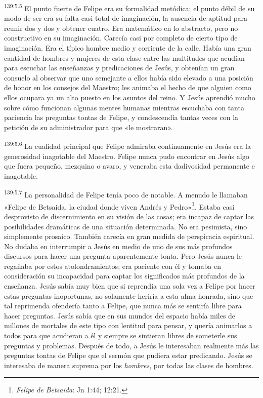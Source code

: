 \par
\textsuperscript{139:5.5} El punto fuerte de Felipe era su formalidad metódica; el punto débil de su modo de ser era su falta casi total de imaginación, la ausencia de aptitud para reunir dos y dos y obtener cuatro. Era matemático en lo abstracto, pero no constructivo en su imaginación. Carecía casi por completo de cierto tipo de imaginación. Era el típico hombre medio y corriente de la calle. Había una gran cantidad de hombres y mujeres de esta clase entre las multitudes que acudían para escuchar las enseñanzas y predicaciones de Jesús, y obtenían un gran consuelo al observar que uno semejante a ellos había sido elevado a una posición de honor en los consejos del Maestro; les animaba el hecho de que alguien como ellos ocupara ya un alto puesto en los asuntos del reino. Y Jesús aprendió mucho sobre cómo funcionan algunas mentes humanas mientras escuchaba con tanta paciencia las preguntas tontas de Felipe, y condescendía tantas veces con la petición de su administrador para que «le mostraran».

\par
\textsuperscript{139:5.6} La cualidad principal que Felipe admiraba continuamente en Jesús era la generosidad inagotable del Maestro. Felipe nunca pudo encontrar en Jesús algo que fuera pequeño, mezquino o avaro, y veneraba esta dadivosidad permanente e inagotable.

\par
\textsuperscript{139:5.7} La personalidad de Felipe tenía poco de notable. A menudo le llamaban «Felipe de Betsaida, la ciudad donde viven Andrés y Pedro»\footnote{\textit{Felipe de Betsaida}: Jn 1:44; 12:21.}. Estaba casi desprovisto de discernimiento en su visión de las cosas; era incapaz de captar las posibilidades dramáticas de una situación determinada. No era pesimista, sino simplemente prosaico. También carecía en gran medida de perspicacia espiritual. No dudaba en interrumpir a Jesús en medio de uno de sus más profundos discursos para hacer una pregunta aparentemente tonta. Pero Jesús nunca le regañaba por estos atolondramientos; era paciente con él y tomaba en consideración su incapacidad para captar los significados más profundos de la enseñanza. Jesús sabía muy bien que si reprendía una sola vez a Felipe por hacer estas preguntas inoportunas, no solamente heriría a esta alma honrada, sino que tal reprimenda ofendería tanto a Felipe, que nunca más se sentiría libre para hacer preguntas. Jesús sabía que en sus mundos del espacio había miles de millones de mortales de este tipo con lentitud para pensar, y quería animarlos a todos para que acudieran a él y siempre se sintieran libres de someterle sus preguntas y problemas. Después de todo, a Jesús le interesaban realmente más las preguntas tontas de Felipe que el sermón que pudiera estar predicando. Jesús se interesaba de manera suprema por los \textit{hombres}, por todas las clases de hombres.

